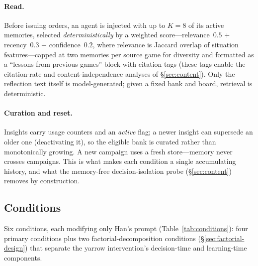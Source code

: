 \documentclass[11pt]{article}
\begin{document}
\paragraph{Read.} Before issuing orders, an agent is injected with up to $K=8$ of its active memories, selected \emph{deterministically} by a weighted score---relevance~$0.5$ $+$ recency~$0.3$ $+$ confidence~$0.2$, where relevance is Jaccard overlap of situation features---capped at two memories per source game for diversity and formatted as a ``lessons from previous games'' block with citation tags (these tags enable the citation-rate and content-independence analyses of \S\ref{sec:content}). Only the reflection text itself is model-generated; given a fixed bank and board, retrieval is deterministic.

\paragraph{Curation and reset.} Insights carry usage counters and an \emph{active} flag; a newer insight can supersede an older one (deactivating it), so the eligible bank is curated rather than monotonically growing. A new campaign uses a fresh store---memory never crosses campaigns. This is what makes each condition a single accumulating history, and what the memory-free decision-isolation probe (\S\ref{sec:content}) removes by construction.

\subsection{Conditions}
\label{sec:conditions}

Six conditions, each modifying only Han's prompt (Table~\ref{tab:conditions}): four primary conditions plus two factorial-decomposition conditions (\S\ref{sec:factorial-design}) that separate the yarrow intervention's decision-time and learning-time components.
\end{document}
